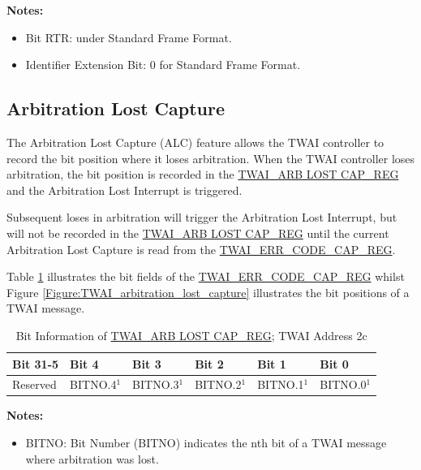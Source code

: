 \documentclass[main\_\_EN.tex]{subfiles}
\begin{document}
\vspace{-1.5em}
{\bfseries Notes:}\\
\begin{itemize}
    \item Bit RTR: under Standard Frame Format.
    \item Identifier Extension Bit: 0 for Standard Frame Format.
\end{itemize}

\subsection{Arbitration Lost Capture}

The Arbitration Lost Capture (ALC) feature allows the TWAI controller to record the bit position where it loses arbitration. When the TWAI controller loses arbitration, the bit position is recorded in the \hyperref[regdesc:TWAIARB LOST CAPREG]{TWAI\_ARB LOST CAP\_REG} and the Arbitration Lost Interrupt is triggered.

Subsequent loses in arbitration will trigger the Arbitration Lost Interrupt, but will not be recorded in the \hyperref[regdesc:TWAIARB LOST CAPREG]{TWAI\_ARB LOST CAP\_REG} until the current Arbitration Lost Capture is read from the \hyperref[regdesc:TWAIERRCODECAPREG]{TWAI\_ERR\_CODE\_CAP\_REG}.

Table \ref{table:ALC_REG} illustrates the bit fields of the \hyperref[regdesc:TWAIERRCODECAPREG]{TWAI\_ERR\_CODE\_CAP\_REG} whilst Figure \ref{Figure:TWAI_arbitration_lost_capture} illustrates the bit positions of a TWAI message.

\begin{longtable}[c]{|p{2.3cm}|p{2.3cm}|p{2.3cm}|p{2.3cm}|p{2.3cm}|p{2.3cm}|}
    \caption{Bit Information of \hyperref[regdesc:TWAIARB LOST CAPREG]{TWAI\_ARB LOST CAP\_REG}; TWAI Address \hexprefix{}2c}
    \label{table:ALC_REG}
    \\\hline
    \rowcolor{lightgray}
  Bit 31-5 & Bit 4 & Bit 3 & Bit 2 & Bit 1 & Bit 0\\ \hline
   Reserved & BITNO.4$^1$ & BITNO.3$^1$ & BITNO.2$^1$ & BITNO.1$^1$ & BITNO.0$^1$\\\hline
\end{longtable}
\vspace{-1.5em}
{\bfseries Notes: }\\
\begin{itemize}
    \item BITNO: Bit Number (BITNO) indicates the nth bit of a TWAI message where arbitration was lost.
\end{itemize}
\end{document}
